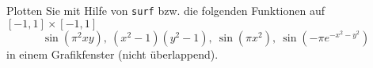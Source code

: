 \begin{aufg}[0]
Plotten Sie mit Hilfe von \lstinline!surf! bzw.  die folgenden Funktionen auf
  $[-1,1]\times [-1,1]$
{
\[ \sin( \pi^2 xy), \ (x^2-1)(y^2-1), \ \sin(\pi x ^2), \ \sin(- \pi
  e^{-x^2-y^2}) \]}
in einem Grafikfenster (nicht überlappend). 
\end{aufg}
